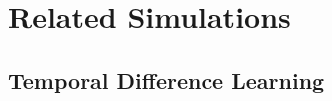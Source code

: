 \chapter{Related Simulations}
\label{chapter:related_simulations}

\section{Temporal Difference Learning}

